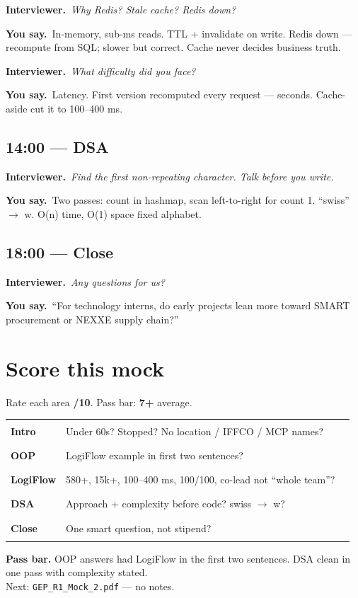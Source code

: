 \documentclass[11pt,a4paper]{article}
\newcommand{\card}[1]{%
  \par\vspace{4pt}%
  \noindent\colorbox{soft}{%
    \parbox{\dimexpr\textwidth-2\fboxsep}{\vspace{5pt}#1\vspace{5pt}}%
  }\par\vspace{5pt}%
}
\newcommand{\IV}[1]{\par\vspace{4pt}\noindent\textcolor{qcol}{\textbf{Interviewer.}}~\textit{#1}\par}
\newcommand{\You}[1]{%
  \par\vspace{2pt}%
  \noindent\colorbox{youbg}{%
    \parbox{\dimexpr\textwidth-2\fboxsep}{\vspace{3pt}\textcolor{you}{\textbf{\small You say.}}~#1\vspace{3pt}}%
  }\par}
\begin{document}
\IV{Why Redis? Stale cache? Redis down?}
\You{In-memory, sub-ms reads. TTL + invalidate on write. Redis down --- recompute from SQL; slower but correct. Cache never decides business truth.}

\IV{What difficulty did you face?}
\You{Latency. First version recomputed every request --- seconds. Cache-aside cut it to 100--400 ms.}

\subsection*{14:00 --- DSA}
\IV{Find the first non-repeating character. Talk before you write.}
\You{Two passes: count in hashmap, scan left-to-right for count 1. ``swiss'' $\rightarrow$ w. O(n) time, O(1) space fixed alphabet.}


\subsection*{18:00 --- Close}
\IV{Any questions for us?}
\You{``For technology interns, do early projects lean more toward SMART procurement or NEXXE supply chain?''}

\section{Score this mock}

Rate each area \textbf{/10}. Pass bar: \textbf{7+} average.

\begin{tabular}{@{}p{3cm}p{9.5cm}c@{}}
\textbf{Intro} & Under 60s? Stopped? No location / IFFCO / MCP names? & \rule{1.4cm}{0.4pt} \\
\textbf{OOP} & LogiFlow example in first two sentences? & \rule{1.4cm}{0.4pt} \\
\textbf{LogiFlow} & 580+, 15k+, 100--400 ms, 100/100, co-lead not ``whole team''? & \rule{1.4cm}{0.4pt} \\
\textbf{DSA} & Approach + complexity before code? swiss $\rightarrow$ w? & \rule{1.4cm}{0.4pt} \\
\textbf{Close} & One smart question, not stipend? & \rule{1.4cm}{0.4pt} \\
\end{tabular}

\vspace{8pt}
\card{\textbf{Pass bar.} OOP answers had LogiFlow in the first two sentences. DSA clean in one pass with complexity stated.\\[4pt]
Next: \texttt{GEP\_R1\_Mock\_2.pdf} --- no notes.}
\end{document}
